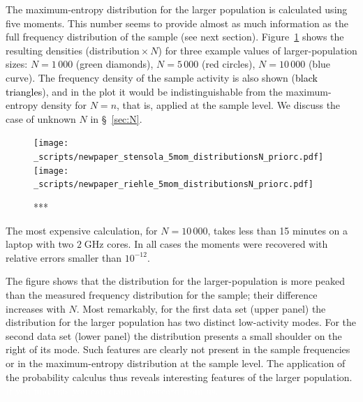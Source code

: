 \documentclass[\ifafour a4paper,12pt,\else a5paper,10pt,\fi%
onecolumn,oneside,article,%
british%
]{memoir}
\theoremstyle{remark}
\theoremstyle{innote}
\renewcommand*{\|}{\nonscript\,\vert\nonscript\;\mathopen{}}
\newcommand*{\sect}{\S}%
\newcommand*{\yAv}{A}
\newcommand*{\yA}{\yAv}%
\newcommand*{\px}{P_{\text{me}}}
\begin{document}

\bigskip

The maximum-entropy distribution for the larger population is calculated
using five moments. This number seems to provide almost as much information
as the full frequency distribution of the sample (see next section).
Figure~\ref{fig:plots_5mom} shows the resulting densities
(distribution${}\times N$) for three example values of larger-population
sizes: $N=1\,000$ (\textcolor{mygreen}{green diamonds}), $N=5\,000$
(\textcolor{myred}{red circles}), $N=10\,000$ (\textcolor{myblue}{blue
  curve}). The frequency density of the sample activity is also shown
(\textcolor{black}{black triangles}), and in the plot it would be
indistinguishable from the maximum-entropy density for $N=n$, that is,
applied at the sample level. We discuss the case of unknown $N$ in
\sect~\ref{sec:N}.
\begin{figure}[!p]
\centering
\texttt{[image: \_scripts/newpaper\_stensola\_5mom\_distributionsN\_priorc.pdf]}%
\\[3em]%
\texttt{[image: \_scripts/newpaper\_riehle\_5mom\_distributionsN\_priorc.pdf]}%
\caption{***}
\label{fig:plots_5mom}
\end{figure}

The most expensive calculation, for $N=10\,000$, takes less than 15 minutes
on a laptop with two $2\;\textrm{GHz}$ cores. In all cases the moments were
recovered with relative errors smaller than $10^{-12}$.

The figure shows that the distribution for the larger-population is more
peaked than the measured frequency distribution for the sample; their
difference increases with $N$. Most remarkably, for the first data set
(upper panel) the distribution for the larger population has two distinct
low-activity modes. For the second data set (lower panel) the distribution
presents a small shoulder on the right of its mode.
Such features are clearly not present in the sample frequencies or in the
maximum-entropy distribution at the sample level. The application of the
probability calculus thus reveals interesting features of the larger
population. \textcolor{white}{If you find this you can claim a postcard
  from us.}
\end{document}
